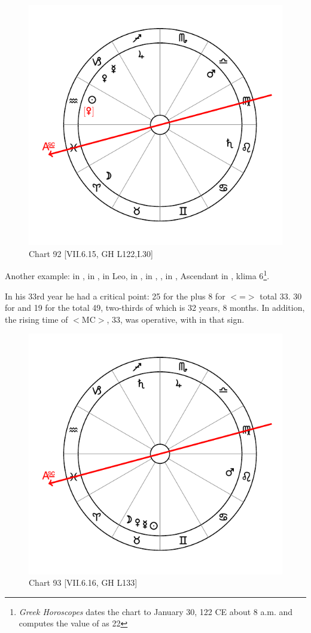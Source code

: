 \newpage
\begin{figure}
\centering
\vspace{0pt}
\includegraphics[width=.68\textwidth]{charts/7_6_15}
\caption{Chart 92 [VII.6.15, GH L122,I.30] }
\label{fig:chart92}
\end{figure} 

Another example: \Sun\xspace in \Aquarius, \Moon\xspace in \Aries, \Saturn\xspace in Leo, \Jupiter\xspace in \Sagittarius, \Mars\xspace in \Libra, \Venus, \Mercury\xspace in \Capricorn, Ascendant in \Pisces, klima 6\footnote{\textit{Greek Horoscopes} dates the chart to January 30, 122 CE about 8 a.m. and computes the value of \Venus\xspace as 22 \Aquarius}.

In his 33rd year he had a critical point: 25 for the \Moon\xspace plus 8 for \Libra\xspace $<$=\Venus$>$ total 33. 30 for \Saturn\xspace and 19 for the \Sun\xspace total 49, two-thirds of which is 32 years, 8 months. In addition, the rising time of \Sagittarius\xspace $<$MC$>$, 33, was operative, with \Jupiter\xspace in that sign.

\newpage
\begin{figure}
\centering
\vspace{0pt}
\includegraphics[width=.68\textwidth]{charts/7_6_16}
\caption{Chart 93 [VII.6.16, GH L133] }
\label{fig:chart93}
\end{figure} 


